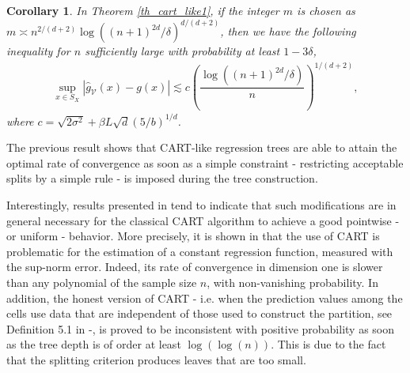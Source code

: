 \documentclass[paper=a4, fontsize=11pt]{scrartcl}
\newtheorem{corollary}[theorem]{Corollary}
\begin{document}
\begin{corollary}\label{cor_cart_like1}
In Theorem \ref{th_cart_like1}, if the integer $m$ is chosen as $m \asymp n^{2/(d+2)} \log((n+1)^{2d}/\delta)^{d/(d+2)}$, then we have the following inequality for $n$ sufficiently large with probability at least $1-3\delta$, 
   \begin{align*}
      \sup_{x\in S_X} | \hat g_{\mathcal V}(x) - g(x)|  \lesssim c \left( \dfrac{\log((n+1)^{2d}/\delta)}{n}\right)^{1/(d+2)},
   \end{align*}
  where $c =   \sqrt{2\sigma^2} + \beta L \sqrt{d} ({5}/ b )^{1/d}$.
\end{corollary}


The previous result shows that CART-like regression trees are able to attain the optimal rate of convergence as soon as a simple constraint - restricting acceptable splits by a simple rule - is imposed during the tree construction. 

Interestingly, results presented in \cite{cattaneo2022pointwise} tend to indicate that such modifications are in general necessary for the classical CART algorithm to achieve a good pointwise - or uniform - behavior. More precisely, it is shown in \cite{cattaneo2022pointwise} that the use of CART is problematic for the estimation of a constant regression function,  measured with the sup-norm error. Indeed, its rate of convergence in dimension one is slower than any polynomial of the sample size $n$, with non-vanishing probability. In addition, the honest version of CART - i.e. when the prediction values among the cells use data that are independent of those used to construct the partition, see Definition 5.1 in \cite{cattaneo2022pointwise} -, is proved to be inconsistent with positive probability as soon as the tree depth is of order at least $\log(\log(n))$.  This is due to the fact that the splitting criterion produces leaves that are too small.  
\end{document}
